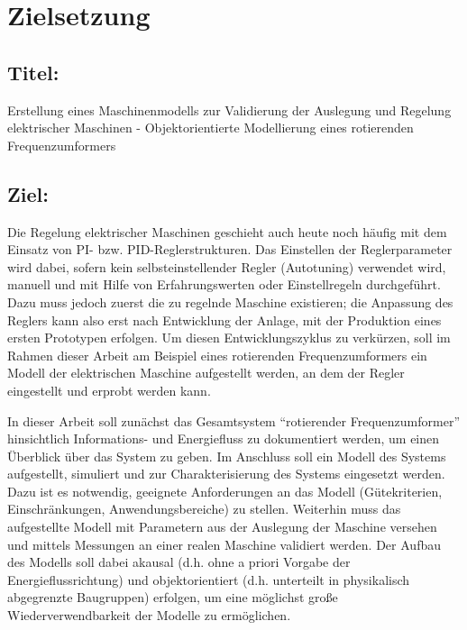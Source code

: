 \hypertarget{zielsetzung}{%
\section{Zielsetzung}\label{zielsetzung}}

\hypertarget{titel}{%
\subsection{Titel:}\label{titel}}

Erstellung eines Maschinenmodells zur Validierung der Auslegung und
Regelung elektrischer Maschinen - Objektorientierte Modellierung eines
rotierenden Frequenzumformers

\hypertarget{Ziel}{%
\subsection{Ziel:}\label{ziel}}

Die Regelung elektrischer Maschinen geschieht auch heute noch häufig mit
dem Einsatz von PI- bzw. PID-Reglerstrukturen. Das Einstellen der
Reglerparameter wird dabei, sofern kein selbsteinstellender Regler
(Autotuning) verwendet wird, manuell und mit Hilfe von Erfahrungswerten
oder Einstellregeln durchgeführt. Dazu muss jedoch zuerst die zu
regelnde Maschine existieren; die Anpassung des Reglers kann also erst
nach Entwicklung der Anlage, mit der Produktion eines ersten Prototypen
erfolgen. Um diesen Entwicklungszyklus zu verkürzen, soll im Rahmen
dieser Arbeit am Beispiel eines rotierenden Frequenzumformers ein Modell
der elektrischen Maschine aufgestellt werden, an dem der Regler
eingestellt und erprobt werden kann.

In dieser Arbeit soll zunächst das Gesamtsystem ``rotierender
Frequenzumformer'' hinsichtlich Informations- und Energiefluss zu
dokumentiert werden, um einen Überblick über das System zu geben. Im
Anschluss soll ein Modell des Systems aufgestellt, simuliert und zur
Charakterisierung des Systems eingesetzt werden. Dazu ist es notwendig,
geeignete Anforderungen an das Modell (Gütekriterien, Einschränkungen,
Anwendungsbereiche) zu stellen. Weiterhin muss das aufgestellte Modell
mit Parametern aus der Auslegung der Maschine versehen und mittels
Messungen an einer realen Maschine validiert werden. Der Aufbau des
Modells soll dabei akausal (d.h. ohne a priori Vorgabe der
Energieflussrichtung) und objektorientiert (d.h. unterteilt in
physikalisch abgegrenzte Baugruppen) erfolgen, um eine möglichst große
Wiederverwendbarkeit der Modelle zu ermöglichen.

